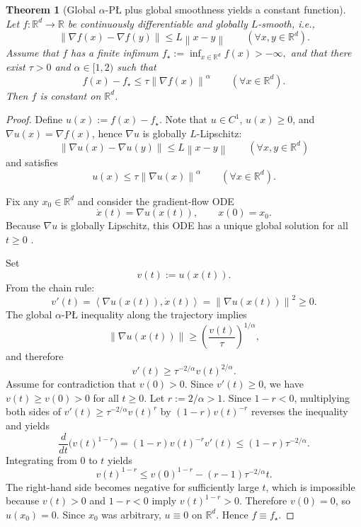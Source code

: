 \documentclass[11pt]{article}
\newtheorem{theorem}{Theorem}[section]
\newcommand{\R}{\mathbb{R}}
\newcommand{\norm}[1]{\left\lVert #1\right\rVert}
\newcommand{\ip}[2]{\left\langle #1,#2\right\rangle}
\begin{document}
\begin{theorem}[Global $\alpha$-P\L{} plus global smoothness yields a constant function]
\label{thm:global-trivial}
Let $f:\R^d\to\R$ be continuously differentiable and globally $L$-smooth, i.e.,
\[
\norm{\nabla f(x)-\nabla f(y)}\le L\norm{x-y}
\qquad (\forall x,y\in\R^d).
\]
Assume that $f$ has a finite infimum $f_\star:=\inf_{x\in\R^d}f(x)>-\infty,$ and that there exist $\tau>0$ and $\alpha\in[1,2)$ such that
\[
f(x)-f_\star\le \tau \norm{\nabla f(x)}^\alpha
\qquad (\forall x\in\R^d).
\]
Then $f$ is constant on $\R^d$.
\end{theorem}

\begin{proof}
Define $u(x):=f(x)-f_\star$. Note that $u\in C^1$, $u(x)\ge 0$, and $\nabla u(x)=\nabla f(x)$, hence
 $\nabla u$ is globally $L$-Lipschitz:
\[
\norm{\nabla u(x)-\nabla u(y)}\le L\norm{x-y}
\qquad (\forall x,y\in\R^d)
\]
and satisfies
\[
u(x)\le \tau \norm{\nabla u(x)}^\alpha
\qquad (\forall x\in\R^d).
\]

Fix any $x_0\in\R^d$ and consider the gradient-flow ODE
\[
\dot x(t)=\nabla u(x(t)),
\qquad
x(0)=x_0.
\]
Because $\nabla u$ is globally Lipschitz, this ODE has a unique global solution for all $t\ge 0$ \citep[see, e.g., Chapter~1]{CoddingtonLevinson1955}.

Set
\[
v(t):=u(x(t)).
\]
From the chain rule:
\[
v'(t)
=
\ip{\nabla u(x(t))}{\dot x(t)}
=
\norm{\nabla u(x(t))}^2
\ge 0.
\]
The global $\alpha$-P\L{} inequality along the trajectory implies
\[
\norm{\nabla u(x(t))}\ge \left(\frac{v(t)}{\tau}\right)^{1/\alpha},
\]
and therefore
\begin{equation}
\label{eq:ascent-superlinear-gap}
v'(t)\ge \tau^{-2/\alpha}v(t)^{2/\alpha}.
\end{equation}
Assume for contradiction that $v(0)>0$.
Since $v'(t)\ge 0$, we have $v(t)\ge v(0)>0$ for all $t\ge 0$.
Let $r:={2}/{\alpha}>1$.
Since $1-r<0$, multiplying both sides of $v'(t)\ge \tau^{-2/\alpha}v(t)^r$ by $(1-r)v(t)^{-r}$ reverses the inequality and yields
\[
\frac{d}{dt}\bigl(v(t)^{1-r}\bigr)
=(1-r)v(t)^{-r}v'(t)
\le
(1-r)\tau^{-2/\alpha}.
\]
Integrating from $0$ to $t$ yields
\[
v(t)^{1-r}
\le
v(0)^{1-r}-(r-1)\tau^{-2/\alpha}t.
\]
The right-hand side becomes negative for sufficiently large $t$, which is impossible because $v(t)>0$ and $1-r<0$ imply $v(t)^{1-r}>0$.
Therefore $v(0)=0$, so $u(x_0)=0$.
Since $x_0$ was arbitrary, $u\equiv 0$ on $\R^d$.
Hence $f\equiv f_\star$.
\end{proof}
\end{document}
